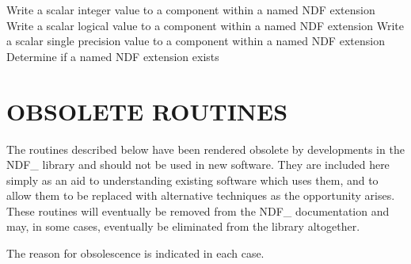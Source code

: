            {Write a scalar integer value to a component within a named NDF extension}
            {Write a scalar logical value to a component within a named NDF extension}
            {Write a scalar single precision value to a component within a named NDF extension}
     {Determine if a named NDF extension exists}

\newpage
\section{\label{ss:obsoleteroutines}OBSOLETE ROUTINES}
The routines described below have been rendered obsolete by
developments in the NDF\_ library and should not be used in new
software. They are included here simply as an aid to understanding
existing software which uses them, and to allow them to be replaced
with alternative techniques as the opportunity arises. These routines
will eventually be removed from the NDF\_ documentation and may, in
some cases, eventually be eliminated from the library altogether.

The reason for obsolescence is indicated in each case.

